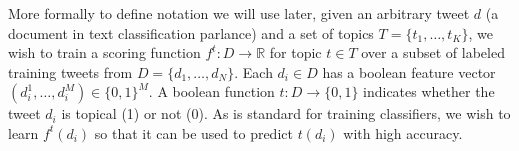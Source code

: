 More formally to define notation we will use later, 
given an arbitrary tweet $d$ (a document in text classification parlance) 
and a set of topics $T = \{
t_1,\ldots,t_K\}$, we wish to train a scoring function $f^t: D \rightarrow \mathbb{R}$
for topic $t \in T$ over a subset of labeled training tweets from $D = \{
d_1,\ldots,d_N \}$.  Each $d_i \in D$ has a boolean feature vector 
$(d_i^1,\ldots,d_i^M) \in \{0,1\}^M$.  A boolean function $t : D \rightarrow \{
0,1 \}$ indicates whether the tweet $d_i$ is topical (1) or not
(0).  As is standard for training classifiers, we wish to learn $ f^t(d_i)$ so that it can be used to predict $t(d_i)$ with high accuracy.


%

%
%


